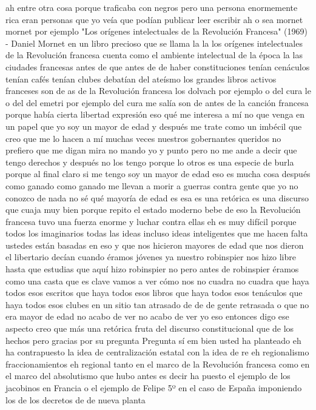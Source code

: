 ah entre otra cosa porque traficaba con negros pero una persona enormemente rica
eran personas que yo veía que podían publicar leer escribir ah o sea mornet mornet por ejemplo
"Los orígenes intelectuales de la Revolución Francesa" (1969) - Daniel Mornet
en un libro precioso que se llama la la los orígenes intelectuales de la Revolución francesa cuenta como el ambiente intelectual de la época
la las ciudades francesas antes de que antes de de haber constituciones tenían cenáculos tenían cafés tenían clubes
debatían del ateísmo los grandes libros activos franceses son de as de la Revolución francesa los dolvach por ejemplo
o del cura le o del del emetri por ejemplo del cura me salía son de antes de la canción francesa porque había cierta libertad expresión
eso qué me interesa a mí no que venga en un papel que yo soy un mayor de edad y después me trate como un imbécil
que creo que me lo hacen a mí muchas veces nuestros gobernantes queridos no prefiero que me digan mira no mando yo y punto
pero no me ande a decir que tengo derechos y después no los tengo porque lo otros es una especie de burla porque al final claro
si me tengo soy un mayor de edad eso es mucha cosa después como ganado como ganado me llevan a morir a guerras
contra gente que yo no conozco de nada no sé qué mayoría de edad es esa es una retórica es una discurso que cuaja muy bien porque repito
el estado moderno bebe de eso la Revolución francesa tuvo una fuerza enorme y luchar contra ellas eh
es muy difícil porque todos los imaginarios todas las ideas incluso ideas inteligentes que me hacen falta ustedes
están basadas en eso y que nos hicieron mayores de edad que nos dieron el libertario decían cuando éramos jóvenes ya
nuestro robinspier nos hizo libre hasta que estudias que aquí hizo robinspier no pero antes de robinspier éramos como una casta
que es clave vamos a ver cómo nos no cuadra no cuadra que haya todos esos escritos que haya todos esos libros
que haya todos esos tenáculos que haya todos esos clubes en un sitio tan atrasado de de de gente retrasada o que no era mayor de edad
no acabo de ver no acabo de ver yo eso entonces digo ese aspecto creo que más una retórica
fruta del discurso constitucional que de los hechos pero gracias por su pregunta
Pregunta
sí em bien usted ha planteado eh
ha contrapuesto la idea de centralización estatal con la idea de re eh regionalismo
fraccionamientos eh regional tanto en el marco de la Revolución francesa
como en el marco del absolutismo que hubo antes es decir ha puesto el ejemplo de los jacobinos en Francia
o el ejemplo de Felipe 5º en el caso de España imponiendo los de los decretos de de nueva planta
